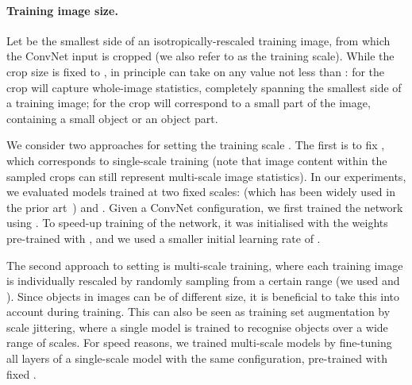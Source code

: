 \documentclass{article} \usepackage{iclr2015,times}
\begin{document}
\paragraph{Training image size.}
Let  be the smallest side of an isotropically-rescaled training image, from which the ConvNet input is cropped (we also refer to  as the training scale).
While the crop size is fixed to , in principle  can take on any value not less than : for  the crop will capture whole-image statistics, completely spanning the smallest side of a training image;
for  the crop will correspond to a small part of the image, containing a small object or an object part.

We consider two approaches for setting the training scale . 
The first is to fix , which corresponds to single-scale training (note that image content within the sampled crops can still represent multi-scale image statistics).
In our experiments, we evaluated models trained at two fixed scales:  (which has been widely used in the prior art~\citep{Krizhevsky12,Zeiler13,Sermanet14}) and .
Given a \mbox{ConvNet} configuration, we first trained the network using . 
To speed-up training of the  network, it was initialised with the weights pre-trained with , and we used a smaller initial learning rate of .

The second approach to setting  is multi-scale training, where each training image is individually rescaled by randomly sampling  from a certain range  (we used  and ). 
Since objects in images can be of different size, it is beneficial to take this into account during training.
This can also be seen as training set augmentation by scale jittering, where a single model is trained to recognise objects over a wide range of scales.
For speed reasons, we trained multi-scale models by fine-tuning all layers of a single-scale model with the same configuration, pre-trained with fixed .
\end{document}
